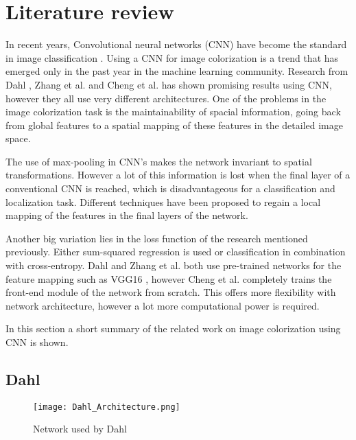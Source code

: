 \section{Literature review} \label{sec:litreview}


In recent years, Convolutional neural networks (CNN) have become the standard in image
classification \cite{Krizhevsky}. Using a CNN for image colorization is a trend that has emerged only in the past year in the machine learning community. Research from Dahl \cite{Dahl}, Zhang et al. \cite{Zhang}
and Cheng et al. \cite{Cheng} has shown promising results using CNN, however they all use very different
architectures. One of the problems in the image colorization task is the maintainability of spacial information, going back from global features to a spatial mapping of these features in the detailed image space. 

The use of max-pooling in CNN's makes the network invariant to spatial transformations. However a lot of this information is lost when the final layer of a conventional CNN is reached, which is disadvantageous for a classification and localization task. Different techniques have been proposed to regain a local mapping of the features in the final layers of the network. 

Another big variation lies in the loss function of the research mentioned previously. Either sum-squared regression is used or classification in combination with cross-entropy. Dahl \cite{Dahl} and Zhang et al. \cite{Zhang} both use pre-trained networks for the feature mapping such as VGG16 \cite{Simonyan}, however Cheng et al. \cite{Cheng} completely trains the front-end module of the network from scratch. This offers more flexibility with network architecture, however a lot more computational power is required. 

In this section a short summary of the related work on image colorization using CNN is shown.

\subsection{Dahl}

\begin{wrapfigure}{R}{0.42\textwidth}
	\vspace{-20pt}
	\begin{center}
		\texttt{[image: Dahl\_Architecture.png]}
	\end{center}
	\caption{Network used by Dahl \cite{Dahl}}
	\label{fig:dahlnetwork}
\end{wrapfigure}


